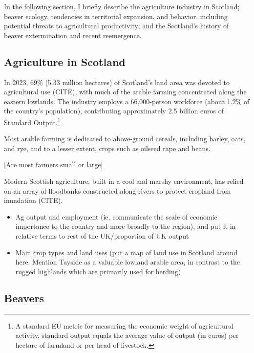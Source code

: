 
In the following section, I briefly describe the agriculture industry in Scotland; beaver ecology, tendencies in territorial expansion, and behavior, including potential threats to agricultural productivity; and the Scotland's history of beaver extermination and recent reemergence. 

\subsection{Agriculture in Scotland}

In 2023, 69\% (5.33 million hectares) of Scotland's land area was devoted to agricultural use (CITE), with much of the arable farming concentrated along the eastern lowlands. The industry employs a 66,000-person workforce (about 1.2\% of the country's population), contributing approximately 2.5 billion euros of Standard Output.\footnote{A standard EU metric for measuring the economic weight of agricultural activity, standard output equals the average value of output (in euros) per hectare of farmland or per head of livestock.}

Most arable farming is dedicated to above-ground cereals, including barley, oats, and rye, and to a lesser extent, crops such as oilseed rape and beans.

[Are most farmers small or large]

Modern Scottish agriculture, built in a cool and marshy environment, has relied on an array of floodbanks constructed along rivers to protect cropland from inundation (CITE).

\begin{itemize}
    \item Ag output and employment (ie, communicate the scale of economic importance to the country and more broadly to the region), and put it in relative terms to rest of the UK/proportion of UK output
    \item Main crop types and land uses (put a map of land use in Scotland around here. Mention Tayside as a valuable lowland arable area, in contrast to the rugged highlands which are primarily used for herding)
\end{itemize}

\subsection{Beavers}

